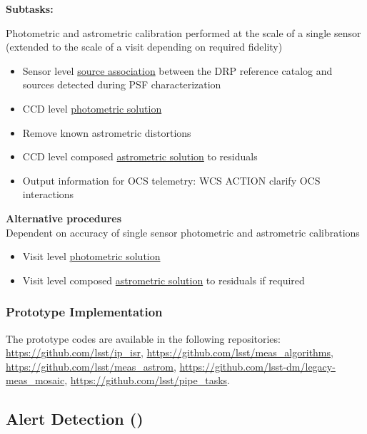 \noindent
{\bf Subtasks:}

Photometric and astrometric calibration performed at the scale of a
single sensor (extended to the scale of a visit depending on required fidelity)
\begin{itemize}
\item Sensor level \hyperref[sec:acSingleCCDReferenceMatching]{source
    association} between the DRP reference catalog and sources
  detected during PSF characterization
\item CCD level \hyperref[sec:acSingleCCDPhotometricFit]{photometric solution}
\item Remove known astrometric distortions 
\item CCD level composed \hyperref[sec:acSingleCCDAstrometricFit]{astrometric
    solution} to residuals
\item Output information for OCS telemetry: WCS ACTION clarify OCS interactions
\end{itemize}

{\bf Alternative procedures}\\
Dependent on accuracy of single sensor photometric and astrometric calibrations
\begin{itemize}
\item Visit level \hyperref[sec:acSingleVisitPhotometricFit]{photometric solution}
\item Visit level composed 
  \hyperref[sec:acSingleVisitAstrometricFit]{astrometric solution} to 
  residuals if required 
\end{itemize}
\noindent


\subsubsection{Prototype Implementation}

The prototype codes are available in the following repositories: \url{https://github.com/lsst/ip_isr}, \url{https://github.com/lsst/meas_algorithms}, \url{https://github.com/lsst/meas_astrom}, \url{https://github.com/lsst-dm/legacy-meas_mosaic}, \url{https://github.com/lsst/pipe_tasks}.

\clearpag

\subsection{Alert Detection (\wbsDiffim)}
\label{sec:apAlertDetection}

